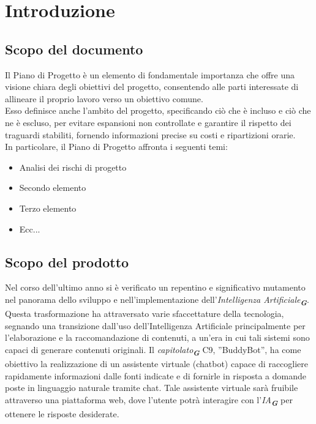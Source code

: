 

\section{Introduzione}
\label{sec:introduzione}

\subsection{Scopo del documento}
Il Piano di Progetto è un elemento di fondamentale importanza che offre una visione chiara degli obiettivi del progetto, 
consentendo alle parti interessate di allineare il proprio lavoro verso un obiettivo comune.\\
Esso definisce anche l'ambito del progetto, specificando ciò che è incluso e ciò che ne è escluso, per evitare espansioni 
non controllate e garantire il rispetto dei traguardi stabiliti, fornendo informazioni precise su costi e ripartizioni orarie.\\
In particolare, il Piano di Progetto affronta i seguenti temi:
\begin{itemize}
    \item Analisi dei rischi di progetto
    \item Secondo elemento
    \item Terzo elemento
    \item Ecc...
\end{itemize}

\subsection{Scopo del prodotto}
Nel corso dell’ultimo anno si è verificato un repentino e significativo mutamento nel panorama dello sviluppo e nell’implementazione dell’\emph{Intelligenza Artificiale}\textsubscript{\textit{\textbf{G}}}. Questa trasformazione ha attraversato varie sfaccettature della tecnologia, segnando una transizione dall’uso dell’Intelligenza Artificiale principalmente per l’elaborazione e la raccomandazione di contenuti, a un’era in cui tali sistemi sono capaci di generare contenuti originali.
Il \emph{capitolato}\textsubscript{\textit{\textbf{G}}} C9, ”BuddyBot”, ha come obiettivo la realizzazione di un assistente virtuale (chatbot) capace di raccogliere rapidamente informazioni dalle fonti indicate e di fornirle in risposta a domande poste in linguaggio naturale tramite chat.
Tale assistente virtuale sarà fruibile attraverso una piattaforma web, dove l’utente potrà interagire con l'\emph{IA}\textsubscript{\textit{\textbf{G}}} per ottenere le risposte desiderate.

